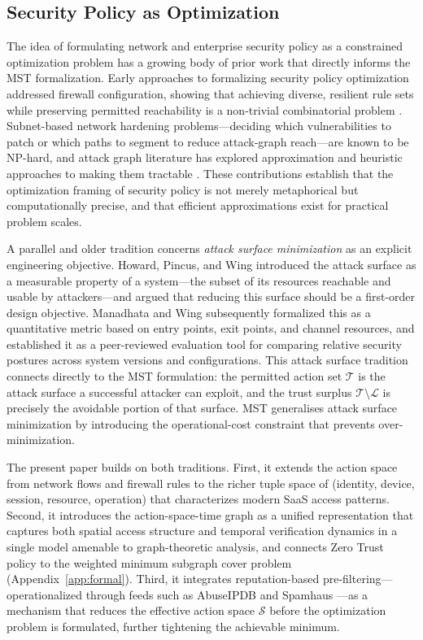\documentclass[unnumsec,webpdf,contemporary,large]{oup-authoring-template}
\theoremstyle{thmstyleone}
\theoremstyle{thmstyletwo}
\theoremstyle{thmstylethree}
\begin{document}
\subsection{Security Policy as Optimization}

The idea of formulating network and enterprise security policy as a constrained
optimization problem has a growing body of prior work that directly informs the MST
formalization. Early approaches to formalizing security policy optimization addressed firewall
configuration, showing that achieving diverse, resilient rule sets while preserving
permitted reachability is a non-trivial combinatorial problem \cite{liu2008}. Subnet-based network hardening problems---deciding
which vulnerabilities to patch or which paths to segment to reduce attack-graph
reach---are known to be NP-hard, and attack graph literature has explored
approximation and heuristic approaches to making them tractable
\cite{shandilya2014, garey1979}. These contributions establish that the optimization
framing of security policy is not merely metaphorical but computationally precise,
and that efficient approximations exist for practical problem scales.

A parallel and older tradition concerns \textit{attack surface minimization} as an
explicit engineering objective. Howard, Pincus, and Wing \cite{howard2005} introduced
the attack surface as a measurable property of a system---the subset of its
resources reachable and usable by attackers---and argued that reducing this surface
should be a first-order design objective. Manadhata and Wing \cite{manadhata2011}
subsequently formalized this as a quantitative metric based on entry points, exit
points, and channel resources, and established it as a peer-reviewed evaluation
tool for comparing relative security postures across system versions and
configurations. This attack surface tradition connects directly to the MST
formulation: the permitted action set $\mathcal{T}$ is the attack surface a
successful attacker can exploit, and the trust surplus $\mathcal{T}\setminus
\mathcal{L}$ is precisely the avoidable portion of that surface. MST generalises
attack surface minimization by introducing the operational-cost constraint that
prevents over-minimization.

The present paper builds on both traditions. First, it extends the action
space from network flows and firewall rules to the richer tuple space of (identity,
device, session, resource, operation) that characterizes modern SaaS access patterns.
Second, it introduces the action-space-time graph as a unified representation that
captures both spatial access structure and temporal verification dynamics in a single
model amenable to graph-theoretic analysis, and connects Zero Trust policy to the
weighted minimum subgraph cover problem (Appendix~\ref{app:formal}). Third, it
integrates reputation-based pre-filtering---operationalized through feeds such as
AbuseIPDB \cite{abuseipdb2024} and Spamhaus \cite{spamhaus2024}---as a mechanism
that reduces the effective action space $\mathcal{S}$ before the optimization
problem is formulated, further tightening the achievable minimum.
\end{document}
